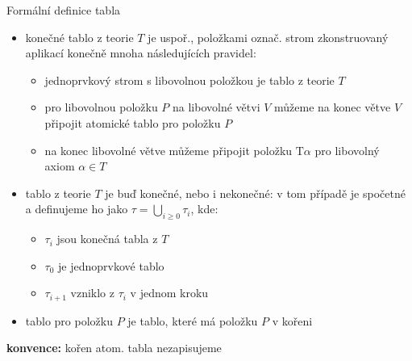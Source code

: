 \documentclass{beamer}
\begin{document}
\begin{frame}{Formální definice tabla}
    
    \pause
    \begin{itemize}
        \item \alert{konečné tablo z teorie $T$} je uspoř., položkami označ. strom zkonstruovaný aplikací konečně mnoha následujících pravidel:\pause
        \begin{itemize}
            \item jednoprvkový strom s libovolnou položkou je tablo z teorie $T$\pause
            \item pro libovolnou položku $P$ na libovolné větvi $V$ můžeme na konec větve $V$ připojit atomické tablo pro položku $P$\pause
            
            \medskip
            

            \medskip
            
            \item na konec libovolné větve můžeme připojit položku $\mathrm{T}\alpha$ pro libovolný axiom $\alpha\in T$\pause
        \end{itemize}
        \item \alert{tablo z teorie $T$} je buď konečné, nebo i nekonečné: v tom případě je spočetné a definujeme ho jako $\tau=\bigcup_{i\geq 0}\tau_i$, kde:\pause
        \begin{itemize}
            \item $\tau_i$ jsou konečná tabla z $T$\pause
            \item $\tau_0$ je jednoprvkové tablo\pause
            \item $\tau_{i+1}$ vzniklo z $\tau_i$ v jednom kroku\pause
        \end{itemize}
        \item \alert{tablo pro položku $P$} je tablo, které má položku $P$ v kořeni\pause
    \end{itemize}
   
    \textbf{konvence:} kořen atom. tabla nezapisujeme  

\end{frame}
\end{document}

